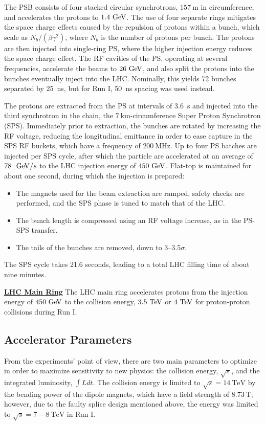 The PSB consists of four stacked circular synchrotrons, $157~\mbox{m}$ in circumference, and accelerates the protons to $1.4 \GeV$. The use of four separate rings mitigates the space charge effects caused by the repulsion of protons within a bunch, which scale as $N_b/(\beta\gamma^2)$, where $N_b$ is the number of protons per bunch. The protons are then injected into single-ring PS, where the higher injection energy reduces the space charge effect. The RF cavities of the PS, operating at several frequencies, accelerate the beams to $26 \GeV$, and also split the protons into the bunches eventually inject into the LHC. Nominally, this yields 72 bunches separated by 25~ns, but for Run I, 50~ns spacing was used instead. 

The protons are extracted from the PS at intervals of 3.6~s and injected into the third synchrotron in the chain, the $7~\mbox{km}$-circumference Super Proton Synchrotron (SPS). Immediately prior to extraction, the bunches are rotated by increasing the RF voltage, reducing the longitudinal emittance in order to ease capture in the SPS RF buckets, which have a frequency of $200~\mbox{MHz}$.  Up to four PS batches are injected per SPS cycle, after which the particle are accelerated at an average of $78~\GeV/s$ to the LHC injection energy of $450 \GeV$. Flat-top is maintained for about one second, during which the injection is prepared:

\begin{itemize}
	\item The magnets used for the beam extraction are ramped, safety checks are performed, and the SPS phase is tuned to match that of the LHC.
	\item The bunch length is compressed using an RF voltage increase, as in the PS-SPS transfer.
	\item The tails of the bunches are removed, down to $3$--$3.5\sigma$.
\end{itemize}

The SPS cycle takes 21.6 seconds, leading to a total LHC filling time of about nine minutes.

\underline{\textbf{LHC Main Ring}}
The LHC main ring accelerates protons from the injection energy of $450 \GeV$ to the collision energy, $3.5 \TeV$ or $4 \TeV$ for proton-proton collisions during Run I. 

\subsection{Accelerator Parameters}
From the experiments' point of view, there are two main parameters to optimize in order to maximize sensitivity to new physics: the collision energy, $\sqrt{s}$, and the integrated luminosity, $\int L dt$. The collision energy is limited to $\sqrt{s}=14~\mbox{TeV}$ by the bending power of the dipole magnets, which have a field strength of $8.73~\mbox{T}$; however, due to the faulty splice design mentioned above, the energy was limited to $\sqrt{s}=7-8~\mbox{TeV}$ in Run I. 

